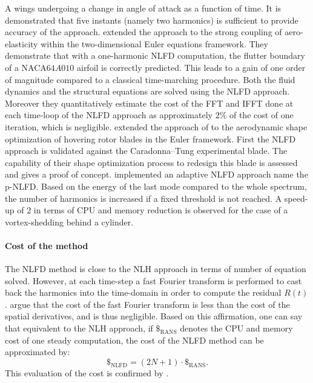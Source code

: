 A wings undergoing a change 
in angle of attack as a function of time. It is demonstrated that
five instants (namely two harmonics) is sufficient to provide
accuracy of the approach.
\citet{Kachra2008} extended the approach to the strong coupling of
aero-elasticity within the two-dimensional Euler equations framework.
They demonstrate that with a one-harmonic NLFD computation, the
flutter boundary of a NACA$64A010$ airfoil is correctly predicted.
This leads to a gain of one order of magnitude compared to a classical
time-marching procedure. Both the fluid dynamics and the structural equations
are solved using the NLFD approach. Moreover they quantitatively estimate the
cost of the FFT and IFFT done at each time-loop of the NLFD approach as
approximately $2\%$ of the cost of one iteration, which is negligible.
\citet{Tatossian2011} extended the approach of \citet{Nadarajah2007}
to the aerodynamic shape optimization of hovering rotor blades
in the Euler framework.
First the NLFD approach is validated
against the Caradonna–Tung experimental blade.
The capability of 
their shape optimization process
to redesign this blade is assessed and gives a proof
of concept.
\citet{Mosahebi2013} implemented an adaptive NLFD approach name
the p-NLFD. Based on the energy of the last mode compared
to the whole spectrum, the number of harmonics
is increased if a fixed threshold is not reached.
A speed-up of $2$ in terms of CPU and
memory reduction is observed for the case of a
vortex-shedding behind a cylinder.




\paragraph{Cost of the method}
The NLFD method is close to the NLH approach in terms of number
of equation solved. However, at each time-step a fast Fourier transform
is performed to cast back the harmonics into the time-domain in order
to compute the residual $R(t)$. \citet{McMullen2006} argue
that the cost of the fast Fourier transform is less than the cost of 
the spatial derivatives, and is thus negligible.
Based on this affirmation, one can say that equivalent to the NLH
approach, if $\mathdollar_{\text{RANS}}$ 
denotes the CPU and memory cost of
one steady computation, the cost of the NLFD method can be 
approximated by:
\begin{equation}
	\mathdollar_{\text{NLFD}} = (2N+1) \cdot \mathdollar_{\text{RANS}}.
\end{equation}
This evaluation of the cost is confirmed by \citet{McMullen2002}.